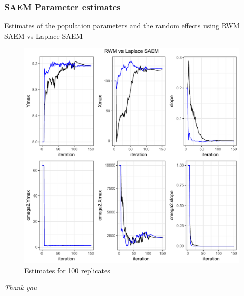 \documentclass[xcolor={dvipsnames}]{beamer}
\begin{document}
\begin{frame}
\frametitle{SAEM Parameter estimates}


Estimates of the population parameters and the random effects using RWM SAEM vs Laplace SAEM
\begin{figure}[h]
\begin{center}
\includegraphics[scale=0.3]{map.pdf}
\end{center}
\caption{Estimates for 100 replicates}
\end{figure}

\end{frame}



\begin{frame}{}
  \centering \Large
  \emph{Thank you}
\end{frame}
\end{document}
